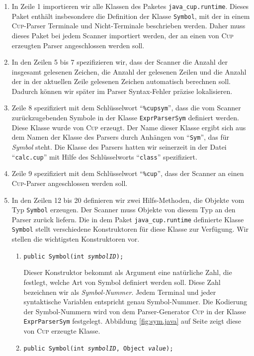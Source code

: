 \begin{enumerate}
\item In Zeile 1 importieren wir alle Klassen des Paketes \texttt{java\_cup.runtime}.
      Dieses Paket enth\"alt insbesondere die Definition der Klasse \texttt{Symbol}, mit der 
      in einem \textsc{Cup}-Parser Terminale und Nicht-Terminale beschrieben werden.
      Daher muss dieses Paket bei jedem Scanner importiert werden, der an einen von
      \textsc{Cup} erzeugten Parser angeschlossen werden soll.
\item In den Zeilen 5 bis 7 spezifizieren wir, dass der Scanner die Anzahl der insgesamt
      gelesenen Zeichen, die Anzahl der gelesenen Zeilen und die Anzahl der in der aktuellen Zeile
      gelesenen Zeichen automatisch berechnen soll.  Dadurch k\"onnen wir sp\"ater im Parser
      Syntax-Fehler pr\"azise lokalisieren.
\item Zeile 8 spezifiziert mit dem Schl\"usselwort ``\texttt{\%cupsym}'', 
      dass die vom Scanner zur\"uckzugebenden Symbole in der Klasse \texttt{ExprParserSym} definiert
      werden.  Diese Klasse wurde von \textsc{Cup} erzeugt.  Der Name dieser Klasse ergibt sich aus
      dem Namen der Klasse des Parsers durch Anh\"angen von ``\texttt{Sym}'', das f\"ur \emph{Symbol} steht.
      Die Klasse des Parsers hatten wir seinerzeit in der Datei ``\texttt{calc.cup}''  mit Hilfe 
      des Schl\"usselworts ``\texttt{class}'' spezifiziert.
\item Zeile 9 spezifiziert mit dem Schl\"usselwort ``\texttt{\%cup}'', 
      dass der Scanner an einen \textsc{Cup}-Parser angeschlossen  werden soll.
\item In den Zeilen 12 bis 20 definieren wir zwei Hilfs-Methoden, die Objekte vom Typ 
      \texttt{Symbol} erzeugen.  Der Scanner muss Objekte von diesem Typ an den Parser zur\"uck
      liefern.  Die in dem Paket \texttt{java\_cup.runtime} definierte Klasse \texttt{Symbol} stellt
      verschiedene Konstruktoren f\"ur diese Klasse zur Verf\"ugung.  Wir stellen die wichtigsten 
      Konstruktoren vor.
      \begin{enumerate}
      \item \texttt{public Symbol(int \textsl{symbolID});}

            Dieser Konstruktor bekommt als Argument eine nat\"urliche Zahl, die festlegt,
            welche Art von Symbol 
            definiert werden soll.  Diese Zahl bezeichnen wir als \emph{Symbol-Nummer}.
            Jedem Terminal und jeder syntaktische Variablen entspricht genau Symbol-Nummer. 
            Die Kodierung der Symbol-Nummern wird von dem Parser-Generator \textsc{Cup} 
            in der Klasse \texttt{ExprParserSym} festgelegt.  Abbildung \ref{fig:sym.java}
            auf Seite \pageref{fig:sym.java} zeigt diese von \textsc{Cup} erzeugte Klasse.
      \item \texttt{public Symbol(int \textsl{symbolID}, Object \textsl{value});}


\end{enumerate}
\end{enumerate}
